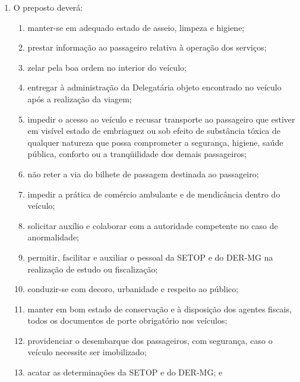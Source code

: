 \begin{enumerate}[resume, label=Art. \arabic*]

\item O preposto deverá:

\begin{enumerate}[label=\roman*.]

\item manter-se em adequado estado de asseio, limpeza e higiene;

\item prestar informação ao passageiro relativa à operação dos serviços;

\item zelar pela boa ordem no interior do veículo;

\item entregar à administração da Delegatária objeto encontrado no veículo após a realização da viagem;

\item impedir o acesso ao veículo e recusar transporte ao passageiro que estiver em visível estado de embriaguez ou sob efeito de substância tóxica de qualquer natureza que possa comprometer a segurança, higiene, saúde pública, conforto ou a tranqüilidade dos demais passageiros;

\item não reter a via do bilhete de passagem destinada ao passageiro;

\item impedir a prática de comércio ambulante e de mendicância dentro do veículo;

\item solicitar auxílio e colaborar com a autoridade competente no caso de anormalidade;

\item permitir, facilitar e auxiliar o pessoal da SETOP e do DER-MG na realização de estudo ou fiscalização;

\item conduzir-se com decoro, urbanidade e respeito ao público;

\item manter em bom estado de conservação e à disposição dos agentes fiscais, todos os documentos de porte obrigatório nos veículos;

\item providenciar o desembarque dos passageiros, com segurança, caso o veículo necessite ser imobilizado;

\item acatar as determinações da SETOP e do DER-MG; e


\end{enumerate}
\end{enumerate}
